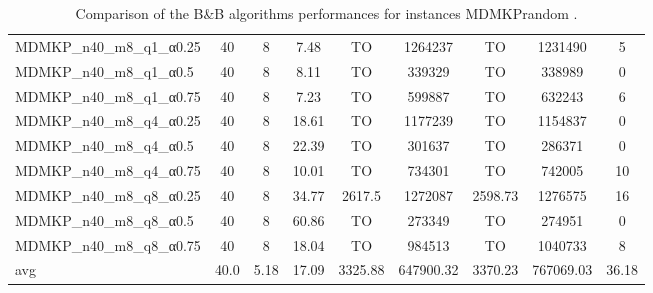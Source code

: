 \begin{table}[!ht]
{\begin{tabular}{lcccccccc}
MDMKP\_n40\_m8\_q1\_α0.25 & 40 & 8 &  \textcolor{blue2}{7.48} & TO & 1264237 & TO & 1231490 & 5 \\
MDMKP\_n40\_m8\_q1\_α0.5 & 40 & 8 &  \textcolor{blue2}{8.11} & TO & 339329 & TO & 338989 & 0 \\
MDMKP\_n40\_m8\_q1\_α0.75 & 40 & 8 &  \textcolor{blue2}{7.23} & TO & 599887 & TO & 632243 & 6 \\
MDMKP\_n40\_m8\_q4\_α0.25 & 40 & 8 &  \textcolor{blue2}{18.61} & TO & 1177239 & TO & 1154837 & 0 \\
MDMKP\_n40\_m8\_q4\_α0.5 & 40 & 8 &  \textcolor{blue2}{22.39} & TO & 301637 & TO & 286371 & 0 \\
MDMKP\_n40\_m8\_q4\_α0.75 & 40 & 8 &  \textcolor{blue2}{10.01} & TO & 734301 & TO & 742005 & 10 \\
MDMKP\_n40\_m8\_q8\_α0.25 & 40 & 8 &  \textcolor{blue2}{34.77} & 2617.5 & 1272087 & 2598.73 & 1276575 & 16 \\
MDMKP\_n40\_m8\_q8\_α0.5 & 40 & 8 &  \textcolor{blue2}{60.86} & TO & 273349 & TO & 274951 & 0 \\
MDMKP\_n40\_m8\_q8\_α0.75 & 40 & 8 &  \textcolor{blue2}{18.04} & TO & 984513 & TO & 1040733 & 8 \\
\cline{1-9} avg & 40.0 & 5.18 & 17.09 & 3325.88& 647900.32 & 3370.23& 767069.03 & 36.18\\ \cline{1-9}
\bottomrule
\end{tabular}
}%
\caption{Comparison of the B\&B algorithms performances for instances MDMKPrandom .}
\label{tab:table_EPSILONvsBBvsEPBBB_MDMKPrandom }
\end{table}
